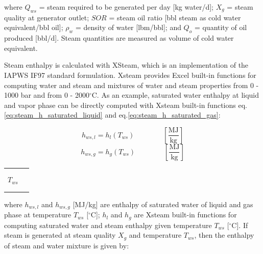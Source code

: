 \documentclass[11pt]{report}
\newcommand{\xlname}[1]{\raisebox{1pt}{\fcolorbox{light-gray}{light-gray}{\texttt{\textcolor{stanford}{\scriptsize{#1}}}}}}
\newcommand{\eqnunitfrac}[2]{\quad\quad \scriptstyle{\left[\frac{\text{#1}}{\text{#2}}\right]}}
\begin{document}
where $Q_{ws}$ = steam required to be generated per day [kg water/d]; $X_{g}$ = steam quality at generator outlet; $SOR$ = steam oil ratio [bbl steam as cold water equivalent/bbl oil]; $\rho_w$ = density of water [lbm/bbl]; and $Q_o$ = quantity of oil produced [bbl/d]. Steam quantities are measured as volume of cold water equivalent.

Steam enthalpy is calculated with XSteam, which is an implementation of the IAPWS IF97 standard formulation. Xsteam provides Excel built-in functions for computing water and steam and mixtures of water and steam properties from 0 - 1000 bar and from 0 - 2000$^\circ$C. \cite{knovel2006} As an example, saturated water enthalpy at liquid and vapor phase can be directly computed with Xsteam built-in functions eq.\eqref{eq:steam_h_saturated_liquid} and eq.\eqref{eq:steam_h_saturated_gas}:

\begin{minipage}{0.6\columnwidth}
\begin{fleqn}[0pt]
\begin{equation}\label{eq:steam_h_saturated_liquid}
h_{ws,l} = h_{l}(T_{ws}) \quad\quad\eqnunitfrac{MJ}{kg}
\end{equation}
\begin{equation}\label{eq:steam_h_saturated_gas}
h_{ws,g} = h_{g}(T_{ws}) \quad\quad\eqnunitfrac{MJ}{kg}
\end{equation}
\end{fleqn}
\end{minipage}\hfill
\begin{minipage}{0.3\columnwidth}
        \begin{tabular}{|cl}
                        & \\
                        & \\
        $T_{ws}$       & \xlname{temperature\_mixed\_steam}\\ 
                        & \\
                        & \\
        \end{tabular}
\end{minipage}

where $h_{ws,l}$ and $h_{ws,g}$ [MJ/kg] are enthalpy of saturated water of liquid and gas phase at temperature $T_{ws}$ [$^\circ$C]; $h_{l}$ and $h_{g}$ are Xsteam built-in functions for computing saturated water and steam enthalpy given temperature $T_{ws}$ [$^\circ$C]. If steam is generated at steam quality $X_{g}$ and temperature $T_{ws}$, then the enthalpy of steam and water mixture is given by:
\end{document}
